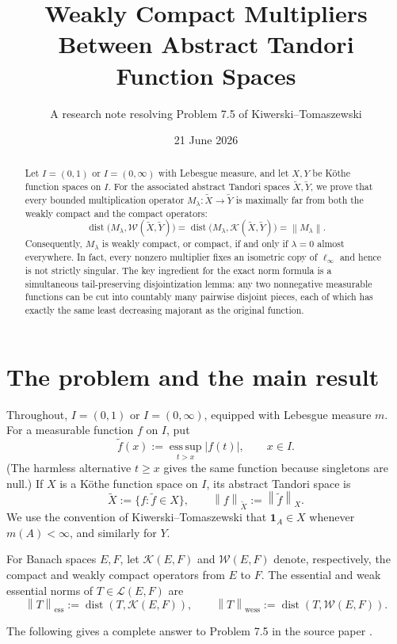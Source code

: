 \documentclass[11pt]{article}
\title{Weakly Compact Multipliers Between Abstract Tandori Function Spaces}
\author{A research note resolving Problem 7.5 of Kiwerski--Tomaszewski}
\date{21 June 2026}
\theoremstyle{remark}
\newcommand{\esssup}{\operatorname*{ess\,sup}}
\newcommand{\dist}{\operatorname{dist}}
\newcommand{\K}{\mathcal K}
\newcommand{\W}{\mathcal W}
\newcommand{\Lin}{\mathcal L}
\newcommand{\tX}{\widetilde X}
\newcommand{\tY}{\widetilde Y}
\newcommand{\tf}{\widetilde f}
\newcommand{\norm}[1]{\left\lVert #1\right\rVert}
\newcommand{\one}{\mathbf 1}
\begin{document}
\maketitle

\begin{abstract}
Let $I=(0,1)$ or $I=(0,\infty)$ with Lebesgue measure, and let $X,Y$ be
K\"othe function spaces on $I$.  For the associated abstract Tandori spaces
$\tX,\tY$, we prove that every bounded multiplication operator
$M_\lambda:\tX\to\tY$ is maximally far from both the weakly compact and the
compact operators:
\[
 \dist\bigl(M_\lambda,\W(\tX,\tY)\bigr)
 =\dist\bigl(M_\lambda,\K(\tX,\tY)\bigr)
 =\norm{M_\lambda}.
\]
Consequently, $M_\lambda$ is weakly compact, or compact, if and only if
$\lambda=0$ almost everywhere.  In fact, every nonzero multiplier fixes an
isometric copy of $\ell_\infty$ and hence is not strictly singular.  The key
ingredient for the exact norm formula is a simultaneous tail-preserving
disjointization lemma: any two nonnegative measurable functions can be cut
into countably many pairwise disjoint pieces, each of which has exactly the
same least decreasing majorant as the original function.
\end{abstract}

\section{The problem and the main result}

Throughout, $I=(0,1)$ or $I=(0,\infty)$, equipped with Lebesgue measure $m$.
For a measurable function $f$ on $I$, put
\[
 \tf(x):=\esssup_{t>x}|f(t)|,\qquad x\in I.
\]
(The harmless alternative $t\geq x$ gives the same function because
singletons are null.)  If $X$ is a K\"othe function space on $I$, its abstract
Tandori space is
\[
 \tX:=\{f:\tf\in X\},\qquad \norm{f}_{\tX}:=\norm{\tf}_X.
\]
We use the convention of Kiwerski--Tomaszewski that $\one_A\in X$ whenever
$m(A)<\infty$, and similarly for $Y$.

For Banach spaces $E,F$, let $\K(E,F)$ and $\W(E,F)$ denote, respectively,
the compact and weakly compact operators from $E$ to $F$.  The essential and
weak essential norms of $T\in\Lin(E,F)$ are
\[
 \norm{T}_{\mathrm{ess}}:=\dist(T,\K(E,F)),\qquad
 \norm{T}_{\mathrm{wess}}:=\dist(T,\W(E,F)).
\]

The following gives a complete answer to Problem 7.5 in the source paper
\cite[Problem 7.5]{KT}.
\end{document}
